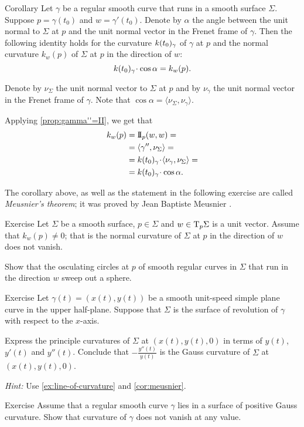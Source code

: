 \begin{thm}{Corollary}\label{cor:meusnier}
Let $\gamma$ be a regular smooth curve that runs in a smooth surface $\Sigma$.
Suppose $p=\gamma(t_0)$ and $w=\gamma'(t_0)$.
Denote by $\alpha$ the angle between the unit normal to $\Sigma$ at $p$ and the unit normal vector in the Frenet frame of $\gamma$.
Then the following identity holds for the curvature $k(t_0)_\gamma$ of $\gamma$ at $p$ and the normal curvature $k_w(p)$ of $\Sigma$ at $p$ in the direction of $w$:  
\[ \kur(t_0)_\gamma\cdot\cos\alpha=k_{w}(p).\]

\end{thm}


Denote by $\nu_\Sigma$ the unit normal vector to $\Sigma$ at $p$ 
and by $\nu_\gamma$ the unit normal vector in the Frenet frame of $\gamma$.
Note that $\cos\alpha=\langle\nu_\Sigma,\nu_\gamma\rangle$.

Applying \ref{prop:gamma''=II}, we get that
\begin{align*}
k_{w}(p)&=\II_p(w,w) =
\\
&=\langle\gamma'',\nu_\Sigma\rangle=
\\
&=\kur(t_0)_\gamma\cdot\langle\nu_\gamma,\nu_\Sigma\rangle=
\\
&=\kur(t_0)_\gamma\cdot\cos\alpha.
\end{align*}
\qedsf

The corollary above, as well as the statement in the following exercise are called \emph{Meusnier's theorem}; it was proved by Jean Baptiste Meusnier \cite{meusnier}.

\begin{thm}{Exercise}\label{ex:meusnier}
Let $\Sigma$ be a smooth surface, $p\in\Sigma$ and $w\in \mathrm{T}_p\Sigma$ is a unit vector.
Assume that $k_w(p)\ne 0$; that is the normal curvature of $\Sigma$ at $p$ in the direction of $w$ does not vanish.

Show that the osculating circles at $p$ of smooth regular curves in $\Sigma$ that run in the direction $w$ sweep out a sphere. 
\end{thm}

\begin{thm}{Exercise}\label{ex:principle-revolution}
Let $\gamma(t)=(x(t),y(t))$ be a smooth unit-speed simple plane curve in the upper half-plane.
Suppose that $\Sigma$ is the surface of revolution of $\gamma$ with respect to the $x$-axis.

Express the principle curvatures of $\Sigma$ at $(x(t),y(t),0)$ in terms of $y(t)$, $y'(t)$ and $y''(t)$.
Conclude that $-\tfrac{y''(t)}{y(t)}$ is the Gauss curvature of $\Sigma$ at $(x(t),y(t),0)$.
\end{thm}

\textit{Hint:} Use \ref{ex:line-of-curvature} and \ref{cor:meusnier}.

\begin{thm}{Exercise}
Assume that a regular smooth curve $\gamma$ lies in a surface of positive Gauss curvature.
Show that curvature of $\gamma$ does not vanish at any value.
\end{thm}
